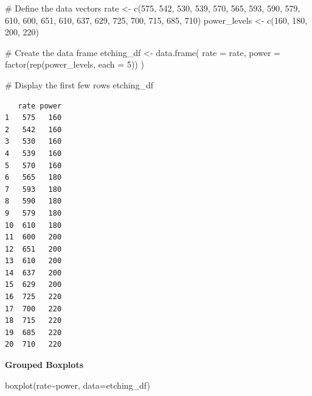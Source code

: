 \documentclass[
  letterpaper,
  DIV=11,
  numbers=noendperiod]{scrreprt}
\newenvironment{Shaded}{\begin{snugshade}}{\end{snugshade}}
\newcommand{\AttributeTok}[1]{\textcolor[rgb]{0.40,0.45,0.13}{#1}}
\newcommand{\CommentTok}[1]{\textcolor[rgb]{0.37,0.37,0.37}{#1}}
\newcommand{\DecValTok}[1]{\textcolor[rgb]{0.68,0.00,0.00}{#1}}
\newcommand{\FunctionTok}[1]{\textcolor[rgb]{0.28,0.35,0.67}{#1}}
\newcommand{\NormalTok}[1]{\textcolor[rgb]{0.00,0.23,0.31}{#1}}
\newcommand{\OtherTok}[1]{\textcolor[rgb]{0.00,0.23,0.31}{#1}}
\newcommand{\SpecialCharTok}[1]{\textcolor[rgb]{0.37,0.37,0.37}{#1}}
\begin{document}
\begin{Shaded}
\begin{Highlighting}[]
\CommentTok{\# Define the data vectors}
\NormalTok{rate }\OtherTok{\textless{}{-}} \FunctionTok{c}\NormalTok{(}\DecValTok{575}\NormalTok{, }\DecValTok{542}\NormalTok{, }\DecValTok{530}\NormalTok{, }\DecValTok{539}\NormalTok{, }\DecValTok{570}\NormalTok{, }\DecValTok{565}\NormalTok{, }\DecValTok{593}\NormalTok{, }\DecValTok{590}\NormalTok{, }\DecValTok{579}\NormalTok{, }\DecValTok{610}\NormalTok{,}
          \DecValTok{600}\NormalTok{, }\DecValTok{651}\NormalTok{, }\DecValTok{610}\NormalTok{, }\DecValTok{637}\NormalTok{, }\DecValTok{629}\NormalTok{, }\DecValTok{725}\NormalTok{, }\DecValTok{700}\NormalTok{, }\DecValTok{715}\NormalTok{, }\DecValTok{685}\NormalTok{, }\DecValTok{710}\NormalTok{)}
\NormalTok{power\_levels }\OtherTok{\textless{}{-}} \FunctionTok{c}\NormalTok{(}\DecValTok{160}\NormalTok{, }\DecValTok{180}\NormalTok{, }\DecValTok{200}\NormalTok{, }\DecValTok{220}\NormalTok{)}

\CommentTok{\# Create the data frame}
\NormalTok{etching\_df }\OtherTok{\textless{}{-}} \FunctionTok{data.frame}\NormalTok{(}
  \AttributeTok{rate =}\NormalTok{ rate,}
  \AttributeTok{power =} \FunctionTok{factor}\NormalTok{(}\FunctionTok{rep}\NormalTok{(power\_levels, }\AttributeTok{each =} \DecValTok{5}\NormalTok{))}
\NormalTok{)}

\CommentTok{\# Display the first few rows}
\NormalTok{etching\_df}
\end{Highlighting}
\end{Shaded}

\begin{verbatim}
   rate power
1   575   160
2   542   160
3   530   160
4   539   160
5   570   160
6   565   180
7   593   180
8   590   180
9   579   180
10  610   180
11  600   200
12  651   200
13  610   200
14  637   200
15  629   200
16  725   220
17  700   220
18  715   220
19  685   220
20  710   220
\end{verbatim}

\textbf{Grouped Boxplots}

\begin{Shaded}
\begin{Highlighting}[]
\FunctionTok{boxplot}\NormalTok{(rate}\SpecialCharTok{\textasciitilde{}}\NormalTok{power, }\AttributeTok{data=}\NormalTok{etching\_df)}
\end{Highlighting}
\end{Shaded}
\end{document}
